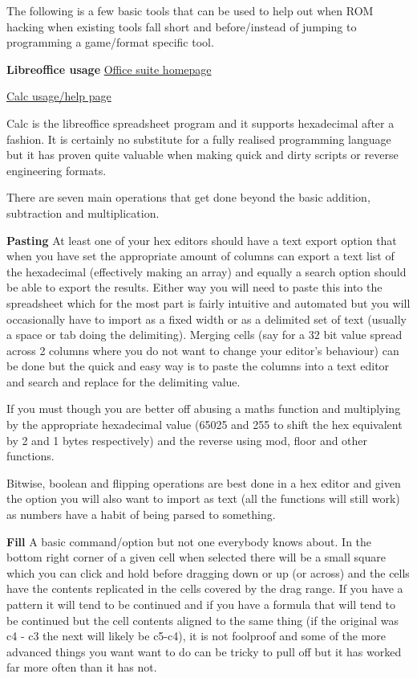 \documentclass[
]{book}
\begin{document}
The following is a few basic tools that can be used to help out when ROM hacking when existing tools fall short and before/instead of jumping to programming a game/format specific tool.

\textbf{Libreoffice usage} \href{http://www.libreoffice.org/}{Office suite homepage}

\href{http://help.libreoffice.org/Calc/Welcome_to_the_Calc_Help}{Calc usage/help page}

Calc is the libreoffice spreadsheet program and it supports hexadecimal after a fashion. It is certainly no substitute for a fully realised programming language but it has proven quite valuable when making quick and dirty scripts or reverse engineering formats.

There are seven main operations that get done beyond the basic addition, subtraction and multiplication.

\textbf{Pasting} At least one of your hex editors should have a text export option that when you have set the appropriate amount of columns can export a text list of the hexadecimal (effectively making an array) and equally a search option should be able to export the results. Either way you will need to paste this into the spreadsheet which for the most part is fairly intuitive and automated but you will occasionally have to import as a fixed width or as a delimited set of text (usually a space or tab doing the delimiting). Merging cells (say for a 32 bit value spread across 2 columns where you do not want to change your editor's behaviour) can be done but the quick and easy way is to paste the columns into a text editor and search and replace for the delimiting value.

If you must though you are better off abusing a maths function and multiplying by the appropriate hexadecimal value (65025 and 255 to shift the hex equivalent by 2 and 1 bytes respectively) and the reverse using mod, floor and other functions.

Bitwise, boolean and flipping operations are best done in a hex editor and given the option you will also want to import as text (all the functions will still work) as numbers have a habit of being parsed to something.

\textbf{Fill} A basic command/option but not one everybody knows about. In the bottom right corner of a given cell when selected there will be a small square which you can click and hold before dragging down or up (or across) and the cells have the contents replicated in the cells covered by the drag range. If you have a pattern it will tend to be continued and if you have a formula that will tend to be continued but the cell contents aligned to the same thing (if the original was c4 - c3 the next will likely be c5-c4), it is not foolproof and some of the more advanced things you want want to do can be tricky to pull off but it has worked far more often than it has not.
\end{document}
